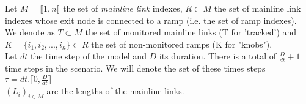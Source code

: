 Let $M=\llbracket 1,n \rrbracket$ the set of \emph{mainline link} indexes, $R\subset{M}$ the set of mainline link indexes whose exit node is connected to a ramp (i.e. the set of ramp indexes). \\
We denote as $T\subset{M}$ the set of monitored mainline links  (T for 'tracked') and $K=\{ i_{1},i_{2},...,i_{\kappa}\}\subset{R}$ the set of non-monitored ramps (K for "knobs").\\
Let $dt$ the time step of the model and $D$ its duration. There is a total of $\frac{D}{dt}+1$ time steps in the scenario. We will denote the set of these times steps $\tau=dt.\llbracket 0,\frac{D}{dt}\rrbracket $\\
$(L_{i})_{i\in M}$ are the lengths of the mainline links.\\